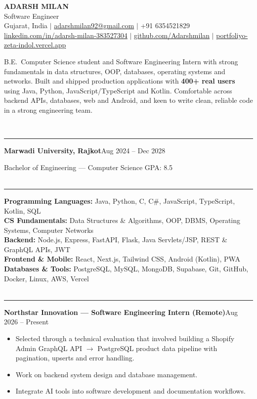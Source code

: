 \documentclass[10pt,a4paper]{article}
\renewcommand{\section}[1]{\vspace{6pt}{\large\bfseries\MakeUppercase{#1}}\\[-7pt]\rule{\textwidth}{0.6pt}\vspace{2pt}}
\newcommand{\entry}[2]{\par\textbf{#1}\hfill #2\par}
\newenvironment{points}{\vspace{-4pt}\begin{itemize}\setlength{\itemsep}{0pt}\setlength{\parskip}{0pt}\setlength{\topsep}{0pt}\setlength{\partopsep}{0pt}\setlength{\leftmargin}{12pt}}{\end{itemize}\vspace{-2pt}}
\newcommand{\sep}{\enspace$|$\enspace}
\begin{document}
\begin{center}
  {\Huge\bfseries ADARSH MILAN}\\[3pt]
  {\large Software Engineer}\\[3pt]
  Gujarat, India \sep
  \href{mailto:adarshmilan92@gmail.com}{adarshmilan92@gmail.com} \sep
  +91 6354521829\\[1pt]
  \href{https://www.linkedin.com/in/adarsh-milan-383527304}{linkedin.com/in/adarsh-milan-383527304} \sep
  \href{https://github.com/Adarshmilan}{github.com/Adarshmilan} \sep
  \href{https://portfoliyo-zeta-indol.vercel.app/}{portfoliyo-zeta-indol.vercel.app}
\end{center}

B.E.\ Computer Science student and Software Engineering Intern with strong fundamentals in data structures,
OOP, databases, operating systems and networks. Built and shipped production applications with \textbf{400+ real users}
using Java, Python, JavaScript/TypeScript and Kotlin. Comfortable across backend APIs, databases, web and Android,
and keen to write clean, reliable code in a strong engineering team.

\section{Education}
\entry{Marwadi University, Rajkot}{Aug 2024 -- Dec 2028}
Bachelor of Engineering --- Computer Science \hfill GPA: 8.5\\

\section{Skills}
\textbf{Programming Languages:} Java, Python, C, C\#, JavaScript, TypeScript, Kotlin, SQL\\
\textbf{CS Fundamentals:} Data Structures \& Algorithms, OOP, DBMS, Operating Systems, Computer Networks\\
\textbf{Backend:} Node.js, Express, FastAPI, Flask, Java Servlets/JSP, REST \& GraphQL APIs, JWT\\
\textbf{Frontend \& Mobile:} React, Next.js, Tailwind CSS, Android (Kotlin), PWA\\
\textbf{Databases \& Tools:} PostgreSQL, MySQL, MongoDB, Supabase, Git, GitHub, Docker, Linux, AWS, Vercel\\

\section{Experience}
\entry{Northstar Innovation --- Software Engineering Intern (Remote)}{Aug 2026 -- Present}
\begin{points}
  \item Selected through a technical evaluation that involved building a Shopify Admin GraphQL API $\rightarrow$ PostgreSQL product data pipeline with pagination, upserts and error handling.
  \item Work on backend system design and database management.
  \item Integrate AI tools into software development and documentation workflows.
\end{points}
\end{document}
